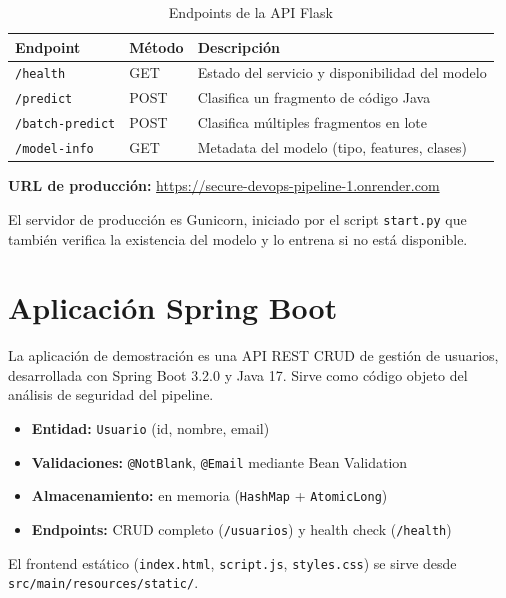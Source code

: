 \documentclass[12pt,a4paper]{article}
\begin{document}
\begin{table}[H]
\centering
\begin{tabular}{@{}llp{7cm}@{}}
\toprule
\textbf{Endpoint}       & \textbf{Método} & \textbf{Descripción} \\
\midrule
\texttt{/health}        & GET             & Estado del servicio y disponibilidad del modelo \\
\texttt{/predict}       & POST            & Clasifica un fragmento de código Java \\
\texttt{/batch-predict} & POST            & Clasifica múltiples fragmentos en lote \\
\texttt{/model-info}    & GET             & Metadata del modelo (tipo, features, clases) \\
\bottomrule
\end{tabular}
\caption{Endpoints de la API Flask}
\end{table}

\textbf{URL de producción:} \url{https://secure-devops-pipeline-1.onrender.com}

El servidor de producción es Gunicorn, iniciado por el script \texttt{start.py} que también verifica la existencia del modelo y lo entrena si no está disponible.

\section{Aplicación Spring Boot}

La aplicación de demostración es una API REST CRUD de gestión de usuarios, desarrollada con Spring Boot 3.2.0 y Java 17. Sirve como código objeto del análisis de seguridad del pipeline.

\begin{itemize}
  \item \textbf{Entidad:} \texttt{Usuario} (id, nombre, email)
  \item \textbf{Validaciones:} \texttt{@NotBlank}, \texttt{@Email} mediante Bean Validation
  \item \textbf{Almacenamiento:} en memoria (\texttt{HashMap} + \texttt{AtomicLong})
  \item \textbf{Endpoints:} CRUD completo (\texttt{/usuarios}) y health check (\texttt{/health})
\end{itemize}

El frontend estático (\texttt{index.html}, \texttt{script.js}, \texttt{styles.css}) se sirve desde \texttt{src/main/resources/static/}.
\end{document}
